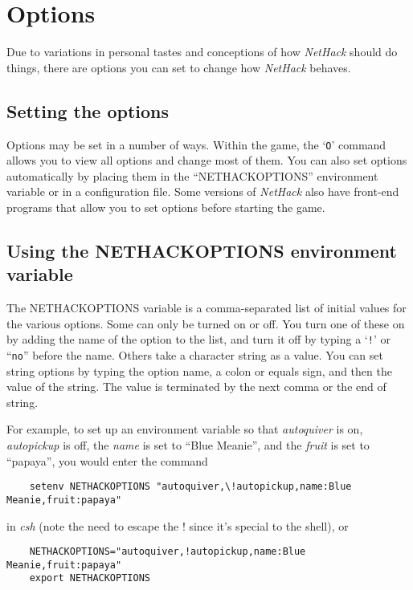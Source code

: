 \section{Options}

Due to variations in personal tastes and conceptions of how {\it NetHack\/}
should do things, there are options you can set to change how {\it NetHack\/}
behaves.

\subsection*{Setting the options}

Options may be set in a number of ways.  Within the game, the `{\tt O}'
command allows you to view all options and change most of them.
You can also set options automatically by placing them in the
``NETHACKOPTIONS'' environment variable or in a configuration file.
Some versions of {\it NetHack\/} also have front-end programs that allow
you to set options before starting the game.

\subsection*{Using the NETHACKOPTIONS environment variable}

The NETHACKOPTIONS variable is a comma-separated list of initial
values for the various options.  Some can only be turned on or off.
You turn one of these on by adding the name of the option to the list,
and turn it off by typing a `{\tt !}' or ``{\tt no}'' before the name.
Others take a
character string as a value.  You can set string options by typing
the option name, a colon or equals sign, and then the value of the string.
The value is terminated by the next comma or the end of string.

For example, to set up an environment variable so that {\it autoquiver\/}
is on, {\it autopickup\/} is off, the {\it name\/} is set to ``Blue Meanie'',
and the {\it fruit\/} is set to ``papaya'', you would enter the command
\begin{verbatim}
    setenv NETHACKOPTIONS "autoquiver,\!autopickup,name:Blue Meanie,fruit:papaya"
\end{verbatim}

\nd in {\it csh}
(note the need to escape the ! since it's special to the shell), or
\begin{verbatim}
    NETHACKOPTIONS="autoquiver,!autopickup,name:Blue Meanie,fruit:papaya"
    export NETHACKOPTIONS
\end{verbatim}

